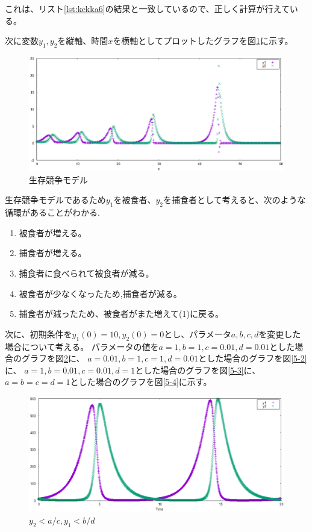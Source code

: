 \documentclass[a4j,titlepage]{jsarticle}
\begin{document}
これは、リスト\ref{lst:kekka6}の結果と一致しているので、正しく計算が行えている。

次に変数$y_1,y_2$を縦軸、時間$x$を横軸としてプロットしたグラフを図\ref{graph_kadai5}に示す。

\begin{figure}[H]
\centering
\includegraphics[scale=0.7]{./img/kadai5.eps}
\caption{生存競争モデル}
\label{graph_kadai5}
\end{figure}

生存競争モデルであるため$y_1$を被食者、$y_2$を捕食者として考えると、次のような循環があることがわかる.

\begin{enumerate}
 \item 被食者が増える。
 \item 捕食者が増える。
 \item 捕食者に食べられて被食者が減る。
 \item 被食者が少なくなったため,捕食者が減る。
 \item 捕食者が減ったため、被食者がまた増えて(1)に戻る。
\end{enumerate}

次に、初期条件を$y_1(0)=10,y_2(0)=0$とし、パラメータ$a,b,c,d$を変更した場合について考える。
パラメータの値を$a=1,b=1,c=0.01,d=0.01$とした場合のグラフを図\ref{5-1}に、
$a=0.01,b=1,c=1,d=0.01$とした場合のグラフを図\ref{5-2}に、
$a=1,b=0.01,c=0.01,d=1$とした場合のグラフを図\ref{5-3}に、
$a=b=c=d=1$とした場合のグラフを図\ref{5-4}に示す。

\begin{figure}[H]
\centering
\includegraphics[scale=0.5]{./img/kadai5_1.eps}
\caption{$y_2<a/c,y_1<b/d$}
\label{5-1}
\end{figure}
\end{document}
